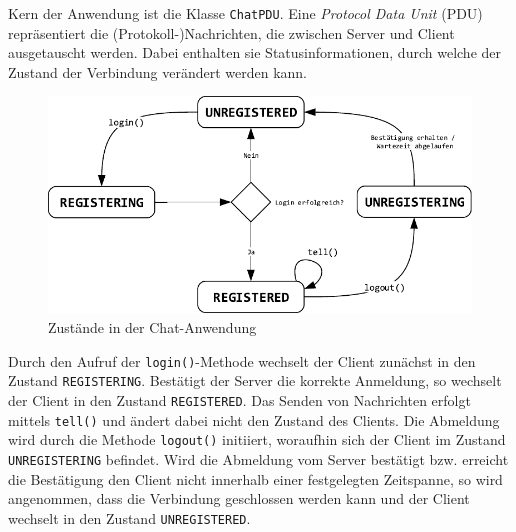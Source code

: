 \documentclass[11pt,a4paper,titlepage]{scrartcl}
\numberwithin{equation}{section}
\begin{document}
\noindent Kern der Anwendung ist die Klasse \texttt{ChatPDU}. Eine \textit{Protocol Data Unit} (PDU) repräsentiert die (Protokoll-)Nachrichten, die zwischen Server und Client ausgetauscht werden. Dabei enthalten sie Statusinformationen, durch welche der Zustand der Verbindung verändert werden kann. 
\medskip
\begin{figure}[ht] 
	\begin{center}
		\includegraphics[scale=1]{img/DaKoZustand.pdf}
		\caption{Zustände in der Chat-Anwendung}
		\label{fig:dakoZustand}
	\end{center}
\end{figure}

\noindent Durch den Aufruf der \texttt{login()}-Methode wechselt der Client zunächst in den Zustand \texttt{REGISTERING}. Bestätigt der Server die korrekte Anmeldung, so wechselt der Client in den Zustand \texttt{REGISTERED}. Das Senden von Nachrichten erfolgt mittels \texttt{tell()} und ändert dabei nicht den Zustand des Clients. Die Abmeldung wird durch die Methode \texttt{logout()} initiiert, woraufhin sich der Client im Zustand \texttt{UNREGISTERING} befindet. Wird die Abmeldung vom Server bestätigt bzw. erreicht die Bestätigung den Client nicht innerhalb einer festgelegten Zeitspanne, so wird angenommen, dass die Verbindung geschlossen werden kann und der Client wechselt in den Zustand \texttt{UNREGISTERED}.\\
\end{document}
